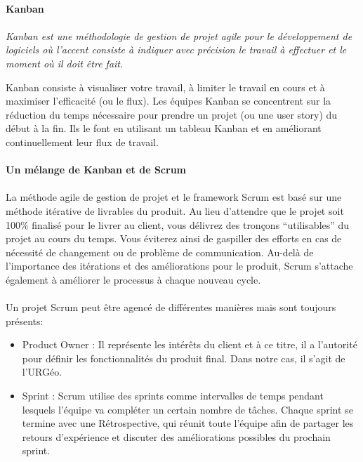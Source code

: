         \paragraph{Kanban}
        \paragraph{}
        \textit{Kanban est une méthodologie de gestion de projet agile pour le développement de logiciels où l'accent
        consiste à indiquer avec précision le travail à effectuer et le moment où il doit être fait}\cite{skauge}.
        \par
        Kanban consiste à visualiser votre travail, à limiter le travail en cours et à maximiser l'efficacité (ou le flux). 
        Les équipes Kanban se concentrent sur la réduction du temps nécessaire pour prendre un projet (ou une user story) 
        du début à la fin. Ils le font en utilisant un tableau Kanban et en améliorant continuellement leur flux de travail.
        \paragraph{Un mélange de Kanban et de Scrum}
        \paragraph{}
        La méthode agile de gestion de projet et le framework Scrum est basé sur une méthode 
        itérative de livrables du produit. Au lieu d’attendre que le projet soit 100\% finalisé 
        pour le livrer au client, vous délivrez des tronçons “utilisables” du projet au cours du 
        temps. Vous éviterez ainsi de gaspiller des efforts en cas de nécessité de changement ou 
        de problème de communication. Au-delà de l’importance des itérations et des améliorations 
        pour le produit, Scrum s’attache également à améliorer le processus à chaque nouveau cycle.
        \paragraph{}
        Un projet Scrum peut être agencé de différentes manières mais sont toujours présents:
        \begin{itemize}
                \item Product Owner : Il représente les intérêts du client et à ce titre, il a 
                l’autorité pour définir les fonctionnalités du produit final. Dans notre cas, il s'agit de l'URGéo.
                \item Sprint : Scrum utilise des sprints comme intervalles de temps pendant lesquels l’équipe 
                va compléter un certain nombre de tâches. Chaque sprint se termine avec une Rétrospective, qui réunit 
                toute l’équipe afin de partager les retours d’expérience et discuter des améliorations possibles du 
                prochain sprint.
        \end{itemize}

